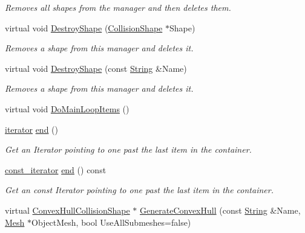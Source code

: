 \begin{DoxyCompactItemize}
\begin{DoxyCompactList}\small\item\em Removes all shapes from the manager and then deletes them. \item\end{DoxyCompactList}\item 
virtual void \hyperlink{classphys_1_1CollisionShapeManager_afb29c685d75584731def62c889cc8136}{DestroyShape} (\hyperlink{classphys_1_1CollisionShape}{CollisionShape} $\ast$Shape)
\begin{DoxyCompactList}\small\item\em Removes a shape from this manager and deletes it. \item\end{DoxyCompactList}\item 
virtual void \hyperlink{classphys_1_1CollisionShapeManager_ad3378ae9511d8c520957c4bb3af6164c}{DestroyShape} (const \hyperlink{namespacephys_aa03900411993de7fbfec4789bc1d392e}{String} \&Name)
\begin{DoxyCompactList}\small\item\em Removes a shape from this manager and deletes it. \item\end{DoxyCompactList}\item 
virtual void \hyperlink{classphys_1_1CollisionShapeManager_af0a99382118672a90e324b7c7585e23f}{DoMainLoopItems} ()
\item 
\hyperlink{classphys_1_1CollisionShapeManager_a2ed1747351ac8bc8d66a433d6f0d9a90}{iterator} \hyperlink{classphys_1_1CollisionShapeManager_a06f4b873fbc0fc148776d3ef5234774b}{end} ()
\begin{DoxyCompactList}\small\item\em Get an Iterator pointing to one past the last item in the container. \item\end{DoxyCompactList}\item 
\hyperlink{classphys_1_1CollisionShapeManager_adaff1c411c3aebf4f8de48bc85ff5a82}{const\_\-iterator} \hyperlink{classphys_1_1CollisionShapeManager_aa7ec448d0af8d8387a3854257d6a57fa}{end} () const 
\begin{DoxyCompactList}\small\item\em Get an const Iterator pointing to one past the last item in the container. \item\end{DoxyCompactList}\item 
virtual \hyperlink{classphys_1_1ConvexHullCollisionShape}{ConvexHullCollisionShape} $\ast$ \hyperlink{classphys_1_1CollisionShapeManager_a2adc84d63da66705dcce1c58bafb5ccc}{GenerateConvexHull} (const \hyperlink{namespacephys_aa03900411993de7fbfec4789bc1d392e}{String} \&Name, \hyperlink{classphys_1_1Mesh}{Mesh} $\ast$ObjectMesh, bool UseAllSubmeshes=false)

\end{DoxyCompactItemize}
